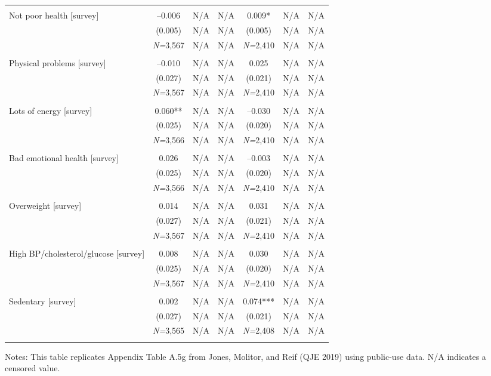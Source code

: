 \documentclass{article}
\begin{document}
\begin{table}[tbp]
{\begin{tabularx}{\linewidth}{lCCCCCC}
&&&&&& \tabularnewline
Not poor health [survey]&--0.006&N/A&N/A&0.009*&N/A&N/A \tabularnewline
&(0.005)&N/A&N/A&(0.005)&N/A&N/A \tabularnewline
&\textit{N=}3,567&N/A&N/A&\textit{N=}2,410&N/A&N/A \tabularnewline
&&&&&& \tabularnewline
Physical problems [survey]&--0.010&N/A&N/A&0.025&N/A&N/A \tabularnewline
&(0.027)&N/A&N/A&(0.021)&N/A&N/A \tabularnewline
&\textit{N=}3,567&N/A&N/A&\textit{N=}2,410&N/A&N/A \tabularnewline
&&&&&& \tabularnewline
Lots of energy [survey]&0.060**&N/A&N/A&--0.030&N/A&N/A \tabularnewline
&(0.025)&N/A&N/A&(0.020)&N/A&N/A \tabularnewline
&\textit{N=}3,566&N/A&N/A&\textit{N=}2,410&N/A&N/A \tabularnewline
&&&&&& \tabularnewline
Bad emotional health [survey]&0.026&N/A&N/A&--0.003&N/A&N/A \tabularnewline
&(0.025)&N/A&N/A&(0.020)&N/A&N/A \tabularnewline
&\textit{N=}3,566&N/A&N/A&\textit{N=}2,410&N/A&N/A \tabularnewline
&&&&&& \tabularnewline
Overweight [survey]&0.014&N/A&N/A&0.031&N/A&N/A \tabularnewline
&(0.027)&N/A&N/A&(0.021)&N/A&N/A \tabularnewline
&\textit{N=}3,567&N/A&N/A&\textit{N=}2,410&N/A&N/A \tabularnewline
&&&&&& \tabularnewline
High BP/cholesterol/glucose [survey]&0.008&N/A&N/A&0.030&N/A&N/A \tabularnewline
&(0.025)&N/A&N/A&(0.020)&N/A&N/A \tabularnewline
&\textit{N=}3,567&N/A&N/A&\textit{N=}2,410&N/A&N/A \tabularnewline
&&&&&& \tabularnewline
Sedentary [survey]&0.002&N/A&N/A&0.074***&N/A&N/A \tabularnewline
&(0.027)&N/A&N/A&(0.021)&N/A&N/A \tabularnewline
&\textit{N=}3,565&N/A&N/A&\textit{N=}2,408&N/A&N/A \tabularnewline
\bottomrule\addlinespace[-1.5ex] 

\end{tabularx}
\begin{flushleft}
\footnotesize Notes: This table replicates Appendix Table A.5g from Jones, Molitor, and Reif (QJE 2019) using public-use data. N/A indicates a censored value.
\end{flushleft}
}
\end{table}
\end{document}
